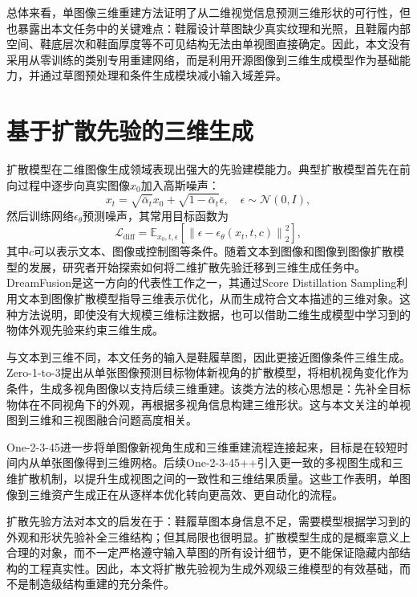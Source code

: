 总体来看，单图像三维重建方法证明了从二维视觉信息预测三维形状的可行性，但也暴露出本文任务中的关键难点：鞋履设计草图缺少真实纹理和光照，且鞋履内部空间、鞋底层次和鞋面厚度等不可见结构无法由单视图直接确定。因此，本文没有采用从零训练的类别专用重建网络，而是利用开源图像到三维生成模型作为基础能力，并通过草图预处理和条件生成模块减小输入域差异。

\section{基于扩散先验的三维生成}

扩散模型在二维图像生成领域表现出强大的先验建模能力。典型扩散模型首先在前向过程中逐步向真实图像$x_0$加入高斯噪声：
\begin{equation}
  x_t = \sqrt{\bar{\alpha}_t}x_0 + \sqrt{1-\bar{\alpha}_t}\epsilon,
  \quad \epsilon \sim \mathcal{N}(0, I),
  \label{eq:diffusion-forward}
\end{equation}
然后训练网络$\epsilon_\theta$预测噪声，其常用目标函数为
\begin{equation}
  \mathcal{L}_{\mathrm{diff}} =
  \mathbb{E}_{x_0,t,\epsilon}
  \left[
    \left\|\epsilon-\epsilon_\theta(x_t,t,c)\right\|_2^2
  \right],
  \label{eq:diffusion-loss}
\end{equation}
其中$c$可以表示文本、图像或控制图等条件。随着文本到图像和图像到图像扩散模型的发展，研究者开始探索如何将二维扩散先验迁移到三维生成任务中。DreamFusion是这一方向的代表性工作之一，其通过Score Distillation Sampling利用文本到图像扩散模型指导三维表示优化，从而生成符合文本描述的三维对象\citep{poole2022dreamfusion}。这种方法说明，即使没有大规模三维标注数据，也可以借助二维生成模型中学习到的物体外观先验来约束三维生成。

与文本到三维不同，本文任务的输入是鞋履草图，因此更接近图像条件三维生成。Zero-1-to-3提出从单张图像预测目标物体新视角的扩散模型，将相机视角变化作为条件，生成多视角图像以支持后续三维重建\citep{liu2023zero123}。该类方法的核心思想是：先补全目标物体在不同视角下的外观，再根据多视角信息构建三维形状。这与本文关注的单视图到三维和三视图融合问题高度相关。

One-2-3-45进一步将单图像新视角生成和三维重建流程连接起来，目标是在较短时间内从单张图像得到三维网格\citep{liu2023one2345}。后续One-2-3-45++引入更一致的多视图生成和三维扩散机制，以提升生成视图之间的一致性和三维结果质量\citep{liu2023one2345pp}。这些工作表明，单图像到三维资产生成正在从逐样本优化转向更高效、更自动化的流程。

扩散先验方法对本文的启发在于：鞋履草图本身信息不足，需要模型根据学习到的外观和形状先验补全三维结构；但其局限也很明显。扩散模型生成的是概率意义上合理的对象，而不一定严格遵守输入草图的所有设计细节，更不能保证隐藏内部结构的工程真实性。因此，本文将扩散先验视为生成外观级三维模型的有效基础，而不是制造级结构重建的充分条件。

